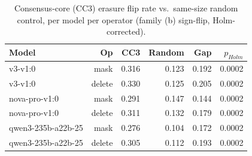 \begin{table}[t]
\centering
\caption{Consensus-core (CC3) erasure flip rate vs.\ same-size random control, per model per operator (family (b) sign-flip, Holm-corrected).}
\label{tab:erasure}
\begin{tabular}{lrrrrr}
\toprule
Model & Op & CC3 & Random & Gap & $p_{Holm}$ \\
\midrule
v3-v1:0 & mask & 0.316 & 0.123 & 0.192 & 0.0002 \\
v3-v1:0 & delete & 0.330 & 0.125 & 0.205 & 0.0002 \\
nova-pro-v1:0 & mask & 0.291 & 0.147 & 0.144 & 0.0002 \\
nova-pro-v1:0 & delete & 0.311 & 0.132 & 0.179 & 0.0002 \\
qwen3-235b-a22b-25 & mask & 0.276 & 0.104 & 0.172 & 0.0002 \\
qwen3-235b-a22b-25 & delete & 0.305 & 0.112 & 0.193 & 0.0002 \\
\bottomrule
\end{tabular}
\end{table}
